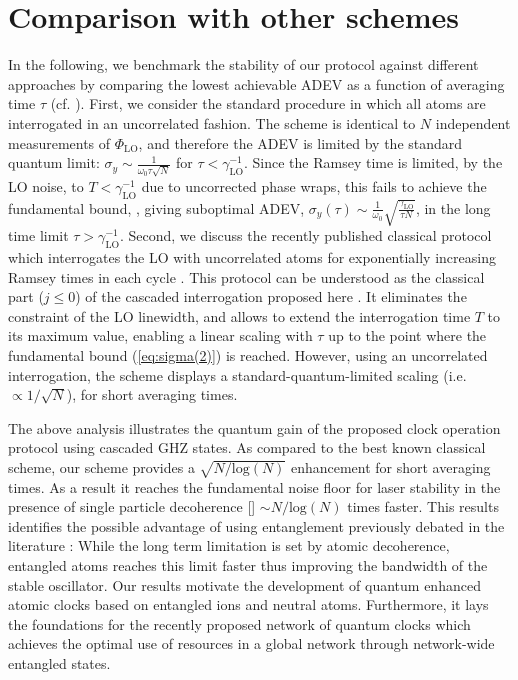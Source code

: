 \section{Comparison with other schemes}
In the following, we benchmark the stability of our protocol against different approaches by
comparing the lowest achievable ADEV as a function of averaging
time $\tau$ (cf. ). 
First, we consider the standard procedure in which all atoms are interrogated
in an uncorrelated fashion. The scheme is identical to $N$
independent measurements of $\Phi_\mathrm{LO}$, and therefore the  ADEV
is limited by the standard quantum limit: $\sigma_y \sim \frac{1}{\omega_0
\tau\sqrt{N}}$ for $\tau < \gamma_\mathrm{LO}^{-1}$.
Since the Ramsey time is limited, by the LO noise, to $T<\gamma_\mathrm{LO}^{-1}$
due to uncorrected phase wraps, this fails to achieve the
fundamental bound, , giving suboptimal ADEV,
  $\sigma_y(\tau) \sim
\frac{1}{\omega_0}\sqrt{\frac{\gamma_\mathrm{LO}}{\tau N}}$, in the long time
limit $ \tau > \gamma_\mathrm{LO}^{-1}$.
Second, we discuss the recently published classical protocol which
interrogates the LO with uncorrelated atoms for exponentially increasing Ramsey
times in each cycle \cite{Borregaard2013, Rosenband2013}. This protocol can be
understood as the classical part ($j\leq0$) of the cascaded interrogation
proposed here .
It eliminates the constraint of the LO linewidth, and allows to extend the interrogation time $T$ to its maximum value, enabling a linear scaling with $\tau$ up to the point where the fundamental bound
(\ref{eq:sigma(2)}) is reached.
However, using an uncorrelated interrogation, the scheme displays a standard-quantum-limited scaling (i.e.
$\propto1/\sqrt{N}$), for short averaging times. 
 
The above analysis illustrates the quantum gain of the proposed clock
operation protocol using cascaded GHZ states. As compared to the best known
classical scheme, our scheme provides a $\sqrt{N/\mathrm{log}(N)}$ enhancement for
short averaging times. As a result it reaches the fundamental noise floor for
laser stability in the presence of single particle decoherence
[] $\sim N/{\mathrm{log}(N)}$ times faster.
This results identifies the possible advantage of using entanglement
previously debated in the literature
\cite{Wineland1998,Huelga1997,LouchetChauvet:2010fs,Rosenband2012_numerical,Borregaard2013_nearHeisenberg,Andre2004,Buzek1999,Meiser:2008fo}:
While the long term limitation is set by atomic decoherence, entangled atoms
reaches this limit faster thus improving the bandwidth of the stable oscillator.
Our results motivate the development of quantum enhanced atomic clocks based on entangled ions
and neutral atoms. Furthermore, it lays the foundations for the recently proposed network of quantum clocks \cite{Komar2014}
which achieves the optimal use of resources in a global network through
network-wide entangled states.

